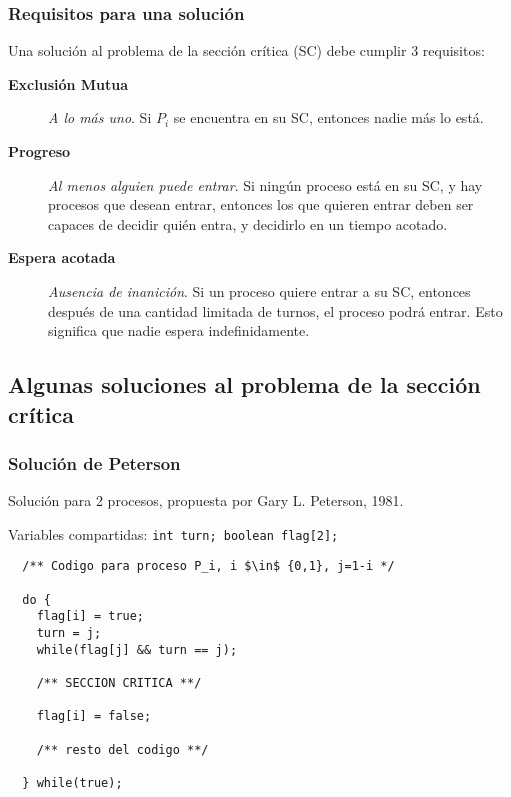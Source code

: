 \documentclass[letter]{beamer}
\begin{document}
\begin{frame}
  \frametitle{Requisitos para una solución}

  Una solución al problema de la sección crítica (SC) debe cumplir 3 requisitos:
  
  \begin{description}
    \item[{\bf Exclusión Mutua}] {\em A lo más uno}. Si $P_i$ se encuentra en su SC, entonces
                                 nadie más lo está.
    \item[{\bf Progreso}] {\em Al menos alguien puede entrar}. Si ningún proceso está en su SC, y hay
                          procesos que desean entrar, entonces los que quieren entrar deben ser capaces
                          de decidir quién entra, y decidirlo en un tiempo acotado.
    \item[{\bf Espera acotada}] {\em Ausencia de inanición}. Si un proceso quiere entrar a su SC, entonces
                                después de una cantidad limitada de turnos, el proceso podrá entrar.
                                Esto significa que nadie espera indefinidamente.
  \end{description}

\end{frame}

\subsection{Algunas soluciones al problema de la sección crítica}

\begin{frame}[fragile]
  \frametitle{Solución de Peterson}
  Solución para 2 procesos, propuesta por Gary L. Peterson, 1981.
  
  Variables compartidas: {\tt int turn; boolean flag[2];}

\begin{verbatim}
  /** Codigo para proceso P_i, i $\in$ {0,1}, j=1-i */
  
  do {
    flag[i] = true;
    turn = j;
    while(flag[j] && turn == j);
    
    /** SECCION CRITICA **/
    
    flag[i] = false;
    
    /** resto del codigo **/
  
  } while(true);

\end{verbatim}


\end{frame}
\end{document}
